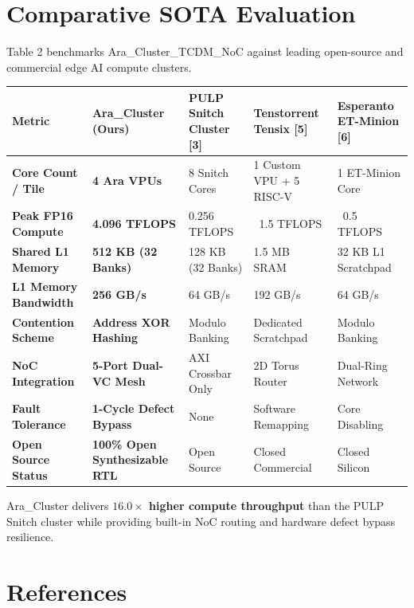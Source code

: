 \documentclass[journal,10pt,twocolumn]{IEEEtran}
\begin{document}
\section{Comparative SOTA Evaluation}

Table 2 benchmarks Ara\_Cluster\_TCDM\_NoC against leading open-source and commercial edge AI compute clusters.

\begin{table}[htbp]
\centering\footnotesize
\begin{tabular}{p{} p{} p{} p{} p{}}
\toprule
\textbf{Metric} & \textbf{Ara\_Cluster (Ours)} & \textbf{PULP Snitch Cluster [3]} & \textbf{Tenstorrent Tensix [5]} & \textbf{Esperanto ET-Minion [6]} \\
\midrule
\textbf{Core Count / Tile} & \textbf{4 Ara VPUs} & 8 Snitch Cores & 1 Custom VPU + 5 RISC-V & 1 ET-Minion Core \\
\textbf{Peak FP16 Compute} & \textbf{4.096 TFLOPS} & 0.256 TFLOPS & ~1.5 TFLOPS & ~0.5 TFLOPS \\
\textbf{Shared L1 Memory} & \textbf{512 KB (32 Banks)} & 128 KB (32 Banks) & 1.5 MB SRAM & 32 KB L1 Scratchpad \\
\textbf{L1 Memory Bandwidth} & \textbf{256 GB/s} & 64 GB/s & 192 GB/s & 64 GB/s \\
\textbf{Contention Scheme} & \textbf{Address XOR Hashing} & Modulo Banking & Dedicated Scratchpad & Modulo Banking \\
\textbf{NoC Integration} & \textbf{5-Port Dual-VC Mesh} & AXI Crossbar Only & 2D Torus Router & Dual-Ring Network \\
\textbf{Fault Tolerance} & \textbf{1-Cycle Defect Bypass} & None & Software Remapping & Core Disabling \\
\textbf{Open Source Status} & \textbf{100\% Open Synthesizable RTL} & Open Source & Closed Commercial & Closed Silicon \\
\bottomrule
\end{tabular}
\vspace{4pt}
\end{table}

Ara\_Cluster delivers \textbf{$16.0\times$ higher compute throughput} than the PULP Snitch cluster while providing built-in NoC routing and hardware defect bypass resilience.


\section{References}
\end{document}
